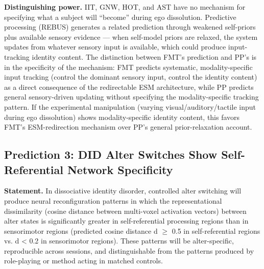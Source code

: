 \documentclass[12pt]{article}
\begin{document}
\textbf{Distinguishing power.} IIT, GNW, HOT, and AST have no mechanism for specifying what a subject will ``become'' during ego dissolution. Predictive processing (REBUS) generates a related prediction through weakened self-priors plus available sensory evidence --- when self-model priors are relaxed, the system updates from whatever sensory input is available, which could produce input-tracking identity content. The distinction between FMT's prediction and PP's is in the specificity of the mechanism: FMT predicts systematic, modality-specific input tracking (control the dominant sensory input, control the identity content) as a direct consequence of the redirectable ESM architecture, while PP predicts general sensory-driven updating without specifying the modality-specific tracking pattern. If the experimental manipulation (varying visual/auditory/tactile input during ego dissolution) shows modality-specific identity content, this favors FMT's ESM-redirection mechanism over PP's general prior-relaxation account.


\subsection{Prediction 3: DID Alter Switches Show Self-Referential Network Specificity}


\textbf{Statement.} In dissociative identity disorder, controlled alter switching will produce neural reconfiguration patterns in which the representational dissimilarity (cosine distance between multi-voxel activation vectors) between alter states is significantly greater in self-referential processing regions than in sensorimotor regions (predicted cosine distance d $\geq$ 0.5 in self-referential regions vs. d < 0.2 in sensorimotor regions). These patterns will be alter-specific, reproducible across sessions, and distinguishable from the patterns produced by role-playing or method acting in matched controls.
\end{document}
